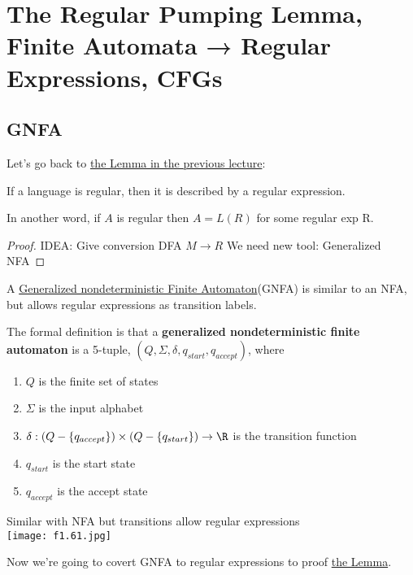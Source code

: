 \chapter{The Regular Pumping Lemma, Finite Automata → Regular Expressions, CFGs}

\section{GNFA}

Let's go back to \hyperref[lemma: 2.2]{the Lemma in the previous lecture}:
\begin{theorem}
    If a language is regular, then it is described by a regular expression.

    In another word, if \(A\) is regular then \(A = L(R)\) for some regular exp R.  
\end{theorem}
\begin{proof}
    IDEA: Give conversion DFA \(M \rightarrow R\) 
    We need new tool: Generalized NFA
\end{proof}

\begin{definition}
    A \underline{Generalized nondeterministic Finite Automaton}(GNFA) is similar to an NFA, but allows regular expressions as transition labels.

    The formal definition is that a \textbf{generalized nondeterministic finite automaton} is a 5-tuple, \((Q, \Sigma, \delta, q_{start}, q_{accept})\), where
    \begin{enumerate}
        \item \(Q\) is the finite set of states
        \item \(\Sigma\) is the input alphabet  
        \item \(\delta: (Q - \{ q_{accept} \}) \times (Q - \{ q_{start} \}) \rightarrow \R \) is the transition function
        \item \(q_{start}\) is the start state
        \item \(q_{accept}\) is the accept state   
    \end{enumerate}  
\end{definition}
\begin{eg}
    Similar with NFA but transitions allow regular expressions\\
    \texttt{[image: f1.61.jpg]}
\end{eg}

Now we're going to covert GNFA to regular expressions to proof \hyperref[lemma: 2.2]{the Lemma}.

